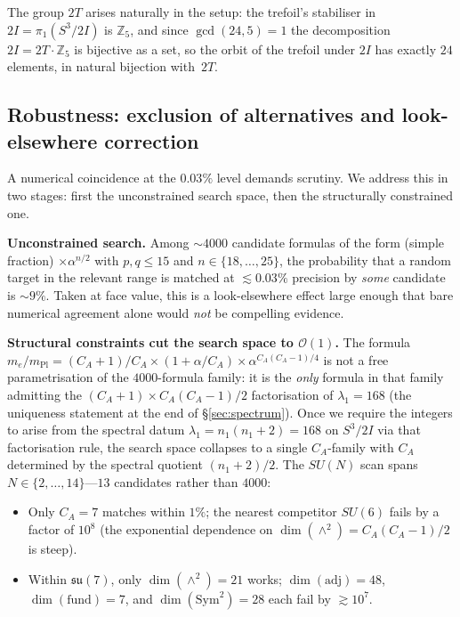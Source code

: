 \documentclass[11pt]{article}
\newcommand{\su}{\mathfrak{su}}
\newcommand{\CA}{C_A}
\begin{document}
The group $2T$ arises naturally in the setup: the trefoil's
stabiliser in $2I = \pi_1(S^3/2I)$ is $\mathbb{Z}_5$, and since
$\gcd(24,5)=1$ the decomposition $2I = 2T \cdot \mathbb{Z}_5$ is
bijective as a set, so the orbit of the trefoil under $2I$ has
exactly $24$ elements, in natural bijection with~$2T$.

\subsection{Robustness: exclusion of alternatives and
look-elsewhere correction}
\label{sec:robustness}

A numerical coincidence at the $0.03\%$ level demands scrutiny.
We address this in two stages: first the unconstrained search
space, then the structurally constrained one.

\medskip
\noindent\textbf{Unconstrained search.}
Among $\sim\!4000$ candidate formulas of the form
(simple fraction) $\times \alpha^{n/2}$ with
$p, q \leq 15$ and $n \in \{18, \ldots, 25\}$, the probability
that a random target in the relevant range is matched at
$\lesssim 0.03\%$ precision by \emph{some} candidate is
$\sim 9\%$.  Taken at face value, this is a look-elsewhere
effect large enough that bare numerical agreement alone would
\emph{not} be compelling evidence.

\medskip
\noindent\textbf{Structural constraints cut the search space to
$\mathcal{O}(1)$.}
The formula
$m_e/m_\text{Pl} = (\CA{+}1)/\CA \times (1 + \alpha/\CA) \times
\alpha^{\CA(\CA-1)/4}$
is not a free parametrisation of the $4000$-formula family: it is
the \emph{only} formula in that family admitting the $(\CA{+}1)
\times \CA(\CA{-}1)/2$ factorisation of $\lambda_1 = 168$ (the
uniqueness statement at the end of \S\ref{sec:spectrum}).  Once
we require the integers to arise from the spectral datum
$\lambda_1 = n_1(n_1{+}2) = 168$ on $S^3/2I$ via that factorisation
rule, the search space collapses to a single $\CA$-family with
$\CA$ determined by the spectral quotient $(n_1{+}2)/2$.  The
$SU(N)$ scan spans $N \in \{2, \ldots, 14\}$---$13$ candidates
rather than $4000$:

\begin{itemize}\setlength\itemsep{1pt}
\item Only $\CA = 7$ matches within $1\%$; the nearest competitor
$SU(6)$ fails by a factor of $10^8$ (the exponential dependence
on $\dim(\wedge^2) = \CA(\CA{-}1)/2$ is steep).
\item Within $\su(7)$, only $\dim(\wedge^2) = 21$ works;
$\dim(\text{adj}) = 48$, $\dim(\text{fund}) = 7$, and
$\dim(\text{Sym}^2) = 28$ each fail by $\gtrsim 10^7$.
\end{itemize}
\end{document}
